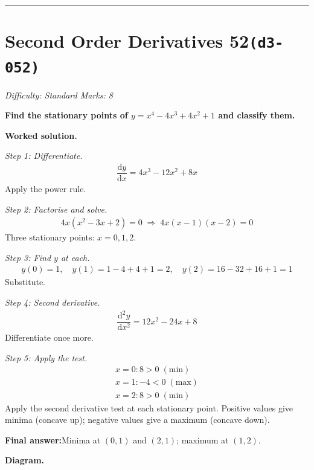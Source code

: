 \documentclass[11pt]{article}
\newcommand{\question}[1]{\par\medskip\noindent\textbf{#1}\par}
\begin{document}
\medskip\hrule

\section*{Second Order Derivatives 52\quad\small\texttt{(d3-052)}}
\textit{Difficulty: Standard \quad\textbar\quad Marks: 8}

\question{Find the stationary points of \( y = x^4 - 4x^3 + 4x^2 + 1 \) and classify them.}

\textbf{Worked solution.}

\textit{Step 1: Differentiate.}
\[\begin{gathered}
\dfrac{\mathrm{d}y}{\mathrm{d}x} = 4x^3 - 12x^2 + 8x
\end{gathered}\]
Apply the power rule.

\textit{Step 2: Factorise and solve.}
\[\begin{gathered}
4x(x^2 - 3x + 2) = 0 \;\Rightarrow\; 4x(x-1)(x-2) = 0
\end{gathered}\]
Three stationary points: \( x = 0, 1, 2 \).

\textit{Step 3: Find \( y \) at each.}
\[\begin{gathered}
y(0) = 1, \quad y(1) = 1 - 4 + 4 + 1 = 2, \quad y(2) = 16 - 32 + 16 + 1 = 1
\end{gathered}\]
Substitute.

\textit{Step 4: Second derivative.}
\[\begin{gathered}
\dfrac{\mathrm{d}^2y}{\mathrm{d}x^2} = 12x^2 - 24x + 8
\end{gathered}\]
Differentiate once more.

\textit{Step 5: Apply the test.}
\[\begin{gathered}
x=0: 8 > 0 \; (\text{min}) \\ x=1: -4 < 0 \; (\text{max}) \\ x=2: 8 > 0 \; (\text{min})
\end{gathered}\]
Apply the second derivative test at each stationary point. Positive values give minima (concave up); negative values give a maximum (concave down).

\begin{answerbox}
\textbf{Final answer:}\quad Minima at \(\displaystyle  (0, 1) \) and \(\displaystyle  (2, 1) \); maximum at \(\displaystyle  (1, 2) \).
\end{answerbox}
\textbf{Diagram.}
\end{document}
